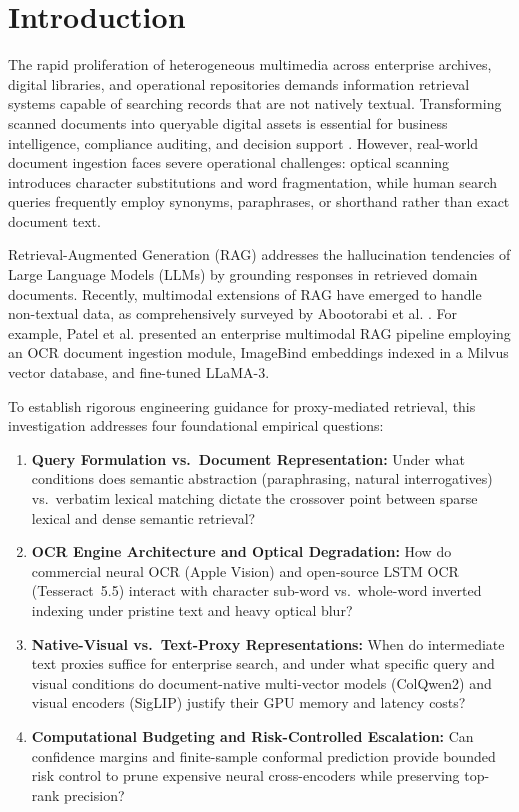 \documentclass[conference]{IEEEtran}
\begin{document}
\section{Introduction}

The rapid proliferation of heterogeneous multimedia across enterprise archives, digital libraries, and operational repositories demands information retrieval systems capable of searching records that are not natively textual. Transforming scanned documents into queryable digital assets is essential for business intelligence, compliance auditing, and decision support \cite{jing2024llmvectordb}. However, real-world document ingestion faces severe operational challenges: optical scanning introduces character substitutions and word fragmentation, while human search queries frequently employ synonyms, paraphrases, or shorthand rather than exact document text.

Retrieval-Augmented Generation (RAG) \cite{lewis2020rag} addresses the hallucination tendencies of Large Language Models (LLMs) by grounding responses in retrieved domain documents. Recently, multimodal extensions of RAG have emerged to handle non-textual data, as comprehensively surveyed by Abootorabi et al. \cite{abootorabi2025multimodal}. For example, Patel et al. \cite{patel2025multimodal} presented an enterprise multimodal RAG pipeline employing an OCR document ingestion module, ImageBind embeddings indexed in a Milvus vector database, and fine-tuned LLaMA-3.

To establish rigorous engineering guidance for proxy-mediated retrieval, this investigation addresses four foundational empirical questions:

\begin{enumerate}
    \setlength{\itemsep}{1pt plus 0.5pt}
    \setlength{\parskip}{0pt}
    \item \textbf{Query Formulation vs.\ Document Representation:} Under what conditions does semantic abstraction (paraphrasing, natural interrogatives) vs.\ verbatim lexical matching dictate the crossover point between sparse lexical and dense semantic retrieval?
    \item \textbf{OCR Engine Architecture and Optical Degradation:} How do commercial neural OCR (Apple Vision) and open-source LSTM OCR (Tesseract~5.5) interact with character sub-word vs.\ whole-word inverted indexing under pristine text and heavy optical blur?
    \item \textbf{Native-Visual vs.\ Text-Proxy Representations:} When do intermediate text proxies suffice for enterprise search, and under what specific query and visual conditions do document-native multi-vector models (ColQwen2) and visual encoders (SigLIP) justify their GPU memory and latency costs?
    \item \textbf{Computational Budgeting and Risk-Controlled Escalation:} Can confidence margins and finite-sample conformal prediction provide bounded risk control to prune expensive neural cross-encoders while preserving top-rank precision?
\end{enumerate}
\end{document}
